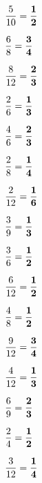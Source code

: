 \documentclass[a4j,fleqn]{jarticle}
\begin{document}
\renewcommand{\baselinestretch}{1.78}
\renewcommand{\labelenumi}{(\theenumi)}
\renewcommand{\labelenumii}{(\arabic{enumii})}

 \twocolumn[


 \vspace*{5ex} ]
 
  \begin{enumerate}

{\Large \item  $\displaystyle \frac{5}{10}={\bf \frac{1}{2}} $} \vfill
{\Large \item  $\displaystyle \frac{6}{8}={\bf \frac{3}{4}} $} \vfill
{\Large \item  $\displaystyle \frac{8}{12}={\bf \frac{2}{3}} $} \vfill
{\Large \item  $\displaystyle \frac{2}{6}={\bf \frac{1}{3}} $} \vfill
{\Large \item  $\displaystyle \frac{4}{6}={\bf \frac{2}{3}} $} \vfill
{\Large \item  $\displaystyle \frac{2}{8}={\bf \frac{1}{4}} $} \vfill
{\Large \item  $\displaystyle \frac{2}{12}={\bf \frac{1}{6}} $} \vfill
{\Large \item  $\displaystyle \frac{3}{9}={\bf \frac{1}{3}} $} \vfill

\newpage
 
{\Large \item  $\displaystyle \frac{3}{6}={\bf \frac{1}{2}} $} \vfill
{\Large \item  $\displaystyle \frac{6}{12}={\bf \frac{1}{2}} $} \vfill
{\Large \item  $\displaystyle \frac{4}{8}={\bf \frac{1}{2}} $} \vfill
{\Large \item  $\displaystyle \frac{9}{12}={\bf \frac{3}{4}} $} \vfill
{\Large \item  $\displaystyle \frac{4}{12}={\bf \frac{1}{3}} $} \vfill
{\Large \item  $\displaystyle \frac{6}{9}={\bf \frac{2}{3}} $} \vfill
{\Large \item  $\displaystyle \frac{2}{4}={\bf \frac{1}{2}} $} \vfill
{\Large \item  $\displaystyle \frac{3}{12}={\bf \frac{1}{4}} $} \vfill

  \end{enumerate}
  
\end{document}
